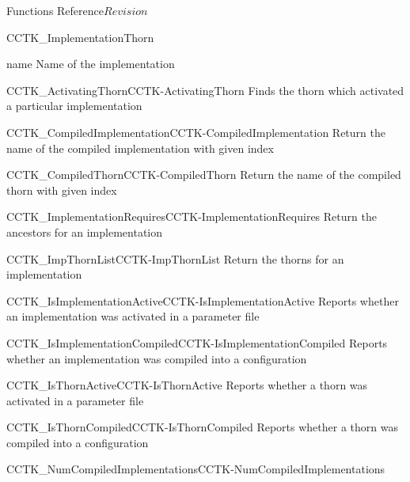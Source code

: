\begin{cactuspart}{ Functions Reference}{}{$Revision$}
\begin{FunctionDescription}{CCTK\_ImplementationThorn}
\begin{ParameterSection}
\begin{Parameter}{name}
Name of the implementation
\end{Parameter}
\end{ParameterSection}


\begin{SeeAlsoSection}
\begin{SeeAlso2}{CCTK\_ActivatingThorn}{CCTK-ActivatingThorn}
  Finds the thorn which activated a particular implementation
\end{SeeAlso2}
\begin{SeeAlso2}{CCTK\_CompiledImplementation}{CCTK-CompiledImplementation}
  Return the name of the compiled implementation with given index
\end{SeeAlso2}
\begin{SeeAlso2}{CCTK\_CompiledThorn}{CCTK-CompiledThorn}
  Return the name of the compiled thorn with given index
\end{SeeAlso2}
\begin{SeeAlso2}{CCTK\_ImplementationRequires}{CCTK-ImplementationRequires}
  Return the ancestors for an implementation
\end{SeeAlso2}
\begin{SeeAlso2}{CCTK\_ImpThornList}{CCTK-ImpThornList}
  Return the thorns for an implementation
\end{SeeAlso2}
\begin{SeeAlso2}{CCTK\_IsImplementationActive}{CCTK-IsImplementationActive}
  Reports whether an implementation was activated in a parameter file
\end{SeeAlso2}
\begin{SeeAlso2}{CCTK\_IsImplementationCompiled}{CCTK-IsImplementationCompiled}
  Reports whether an implementation was compiled into a configuration
\end{SeeAlso2}
\begin{SeeAlso2}{CCTK\_IsThornActive}{CCTK-IsThornActive}
  Reports whether a thorn was activated in a parameter file
\end{SeeAlso2}
\begin{SeeAlso2}{CCTK\_IsThornCompiled}{CCTK-IsThornCompiled}
  Reports whether a thorn was compiled into a configuration
\end{SeeAlso2}
\begin{SeeAlso2}{CCTK\_NumCompiledImplementations}{CCTK-NumCompiledImplementations}

\end{SeeAlso2}
\end{SeeAlsoSection}
\end{FunctionDescription}
\end{cactuspart}
